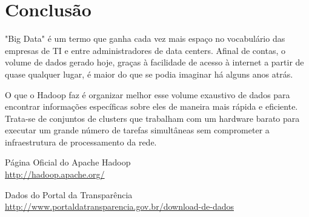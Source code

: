 \documentclass[a4paper,11pt]{article}
\begin{document}
\section{Conclusão}
"Big Data" é um termo que ganha cada vez mais espaço no vocabulário das empresas de TI e entre administradores de data centers. Afinal de contas, o volume de dados gerado hoje, graças à facilidade de acesso à internet a partir de quase qualquer lugar, é maior do que se podia imaginar há alguns anos atrás.

O que o Hadoop faz é organizar melhor esse volume exaustivo de dados para encontrar informações específicas sobre eles de maneira mais rápida e eficiente. Trata-se de conjuntos de clusters que trabalham com um hardware barato para executar um grande número de tarefas simultâneas sem comprometer a infraestrutura de processamento da rede. 



\begin{thebibliography}{5}
	Página Oficial do Apache Hadoop \\
	\url{http://hadoop.apache.org/}
	
	Dados do Portal da Transparência \\
	\url{http://www.portaldatransparencia.gov.br/download-de-dados}
	
    
\end{thebibliography}
\end{document}
